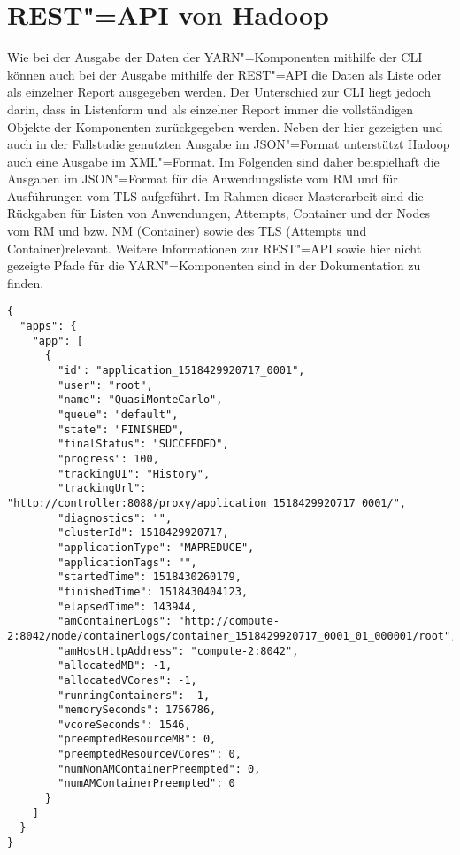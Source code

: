 \chapter{REST"=API von Hadoop}
\label{app:hadoopRestApi}

Wie bei der Ausgabe der Daten der YARN"=Komponenten mithilfe der \gls{CLI} können auch bei der Ausgabe mithilfe der REST"=API die Daten als Liste oder als einzelner Report ausgegeben werden.
Der Unterschied zur \gls{CLI} liegt jedoch darin, dass in Listenform und als einzelner Report immer die vollständigen Objekte der Komponenten zurückgegeben werden.
Neben der hier gezeigten und auch in der Fallstudie genutzten Ausgabe im JSON"=Format unterstützt Hadoop auch eine Ausgabe im XML"=Format.
Im Folgenden sind daher beispielhaft die Ausgaben im JSON"=Format für die Anwendungsliste vom \gls{RM} und für Ausführungen vom \gls{TLS} aufgeführt.
Im Rahmen dieser Masterarbeit sind die Rückgaben für Listen von Anwendungen, Attempts, Container und der Nodes vom \gls{RM} und bzw. \gls{NM} (Container) sowie des \gls{TLS} (Attempts und Container)relevant.
Weitere Informationen zur REST"=API sowie hier nicht gezeigte Pfade für die YARN"=Komponenten sind in der Dokumentation \cite{HadoopYarnTlServer271,HadoopRmApi271,HadoopNmApi271} zu finden.

\begin{lstlisting}[label=lst:hadoopAppListRestRm,style=json,
caption={[REST"=-Ausgabe aller Anwendungen vom \acrshort{RM}]
    REST"=Ausgabe aller Anwendungen vom \acrshort{RM}.
    Die Liste kann mithilfe verschiedener Query"=Parameter gefiltert werden.\\
    URL: \url{http://addr:port/ws/v1/cluster/apps}}]
{
  "apps": {
    "app": [
      {
        "id": "application_1518429920717_0001",
        "user": "root",
        "name": "QuasiMonteCarlo",
        "queue": "default",
        "state": "FINISHED",
        "finalStatus": "SUCCEEDED",
        "progress": 100,
        "trackingUI": "History",
        "trackingUrl": "http://controller:8088/proxy/application_1518429920717_0001/",
        "diagnostics": "",
        "clusterId": 1518429920717,
        "applicationType": "MAPREDUCE",
        "applicationTags": "",
        "startedTime": 1518430260179,
        "finishedTime": 1518430404123,
        "elapsedTime": 143944,
        "amContainerLogs": "http://compute-2:8042/node/containerlogs/container_1518429920717_0001_01_000001/root",
        "amHostHttpAddress": "compute-2:8042",
        "allocatedMB": -1,
        "allocatedVCores": -1,
        "runningContainers": -1,
        "memorySeconds": 1756786,
        "vcoreSeconds": 1546,
        "preemptedResourceMB": 0,
        "preemptedResourceVCores": 0,
        "numNonAMContainerPreempted": 0,
        "numAMContainerPreempted": 0
      }
    ]
  }
}
\end{lstlisting}

